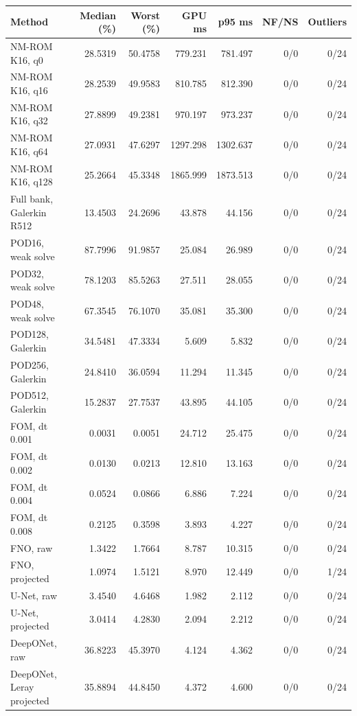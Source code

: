 \begin{table}[htbp]
\centering
\small
\setlength{\tabcolsep}{3pt}
\begin{tabular}{lrrrrrr}
\toprule
Method & Median (\%) & Worst (\%) & GPU ms & p95 ms & NF/NS & Outliers \\
\midrule
NM-ROM K16, q0 & 28.5319 & 50.4758 & 779.231 & 781.497 & 0/0 & 0/24 \\
NM-ROM K16, q16 & 28.2539 & 49.9583 & 810.785 & 812.390 & 0/0 & 0/24 \\
NM-ROM K16, q32 & 27.8899 & 49.2381 & 970.197 & 973.237 & 0/0 & 0/24 \\
NM-ROM K16, q64 & 27.0931 & 47.6297 & 1297.298 & 1302.637 & 0/0 & 0/24 \\
NM-ROM K16, q128 & 25.2664 & 45.3348 & 1865.999 & 1873.513 & 0/0 & 0/24 \\
Full bank, Galerkin R512 & 13.4503 & 24.2696 & 43.878 & 44.156 & 0/0 & 0/24 \\
POD16, weak solve & 87.7996 & 91.9857 & 25.084 & 26.989 & 0/0 & 0/24 \\
POD32, weak solve & 78.1203 & 85.5263 & 27.511 & 28.055 & 0/0 & 0/24 \\
POD48, weak solve & 67.3545 & 76.1070 & 35.081 & 35.300 & 0/0 & 0/24 \\
POD128, Galerkin & 34.5481 & 47.3334 & 5.609 & 5.832 & 0/0 & 0/24 \\
POD256, Galerkin & 24.8410 & 36.0594 & 11.294 & 11.345 & 0/0 & 0/24 \\
POD512, Galerkin & 15.2837 & 27.7537 & 43.895 & 44.105 & 0/0 & 0/24 \\
FOM, dt 0.001 & 0.0031 & 0.0051 & 24.712 & 25.475 & 0/0 & 0/24 \\
FOM, dt 0.002 & 0.0130 & 0.0213 & 12.810 & 13.163 & 0/0 & 0/24 \\
FOM, dt 0.004 & 0.0524 & 0.0866 & 6.886 & 7.224 & 0/0 & 0/24 \\
FOM, dt 0.008 & 0.2125 & 0.3598 & 3.893 & 4.227 & 0/0 & 0/24 \\
FNO, raw & 1.3422 & 1.7664 & 8.787 & 10.315 & 0/0 & 0/24 \\
FNO, projected & 1.0974 & 1.5121 & 8.970 & 12.449 & 0/0 & 1/24 \\
U-Net, raw & 3.4540 & 4.6468 & 1.982 & 2.112 & 0/0 & 0/24 \\
U-Net, projected & 3.0414 & 4.2830 & 2.094 & 2.212 & 0/0 & 0/24 \\
DeepONet, raw & 36.8223 & 45.3970 & 4.124 & 4.362 & 0/0 & 0/24 \\
DeepONet, Leray projected & 35.8894 & 44.8450 & 4.372 & 4.600 & 0/0 & 0/24 \\

\end{tabular}
\end{table}
